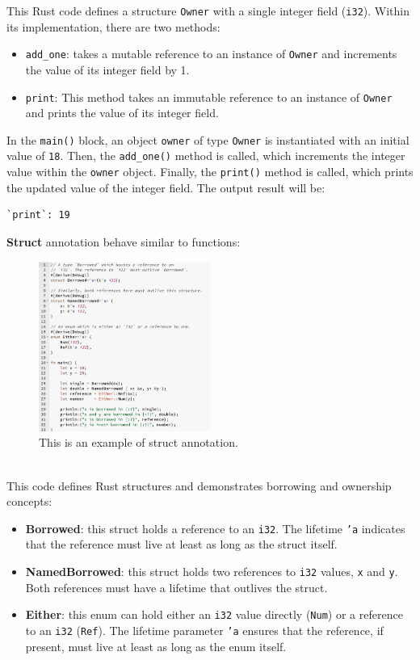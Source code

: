 \documentclass{article}
\begin{document}
This Rust code defines a structure \texttt{Owner} with a single integer field (\texttt{i32}). Within its implementation, there are two methods:
\begin{itemize}
    \item \texttt{add\_one}: takes a mutable reference to an instance of \texttt{Owner} and increments the value of its integer field by 1.
    \item \texttt{print}: This method takes an immutable reference to an instance of \texttt{Owner} and prints the value of its integer field.
\end{itemize}
In the \texttt{main()} block, an object \texttt{owner} of type \texttt{Owner} is instantiated with an initial value of \texttt{18}. Then, the \texttt{add\_one()} method is called, which increments the integer value within the \texttt{owner} object. Finally, the \texttt{print()} method is called, which prints the updated value of the integer field. The output result will be:
\begin{verbatim}
`print`: 19
\end{verbatim}

\textbf{Struct} annotation behave similar to functions:
\begin{figure}[h]
  \centering
  \includegraphics[width=0.5\textwidth]{images/struct_lifetime.png} 
  \caption{This is an example of struct annotation.}
  \label{fig:structu_example}
\end{figure}
\\
This code defines Rust structures and demonstrates borrowing and ownership concepts:

\begin{itemize}
    \item \textbf{Borrowed}: this struct holds a reference to an \texttt{i32}. The lifetime \texttt{'a} indicates that the reference must live at least as long as the struct itself.
    
    \item \textbf{NamedBorrowed}: this struct holds two references to \texttt{i32} values, \texttt{x} and \texttt{y}. Both references must have a lifetime that outlives the struct.
    
    \item \textbf{Either}: this enum can hold either an \texttt{i32} value directly (\texttt{Num}) or a reference to an \texttt{i32} (\texttt{Ref}). The lifetime parameter \texttt{'a} ensures that the reference, if present, must live at least as long as the enum itself.
\end{itemize}
\end{document}
